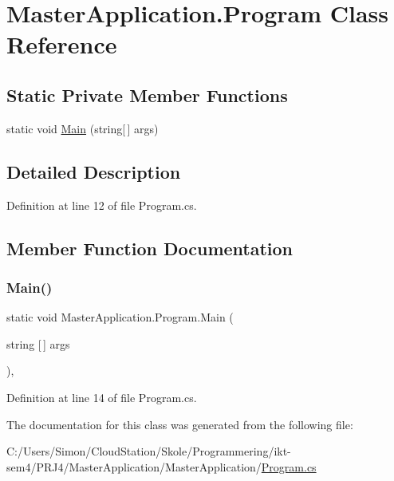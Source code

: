 \hypertarget{class_master_application_1_1_program}{}\section{Master\+Application.\+Program Class Reference}
\label{class_master_application_1_1_program}
\subsection*{Static Private Member Functions}
\begin{DoxyCompactItemize}
\item 
static void \mbox{\hyperlink{class_master_application_1_1_program_a4e4833be669000f1624832d6010d25e0}{Main}} (string\mbox{[}$\,$\mbox{]} args)
\end{DoxyCompactItemize}


\subsection{Detailed Description}


Definition at line 12 of file Program.\+cs.



\subsection{Member Function Documentation}
\mbox{\label{class_master_application_1_1_program_a4e4833be669000f1624832d6010d25e0}} 
\subsubsection{\texorpdfstring{Main()}{Main()}}
{\footnotesize\ttfamily static void Master\+Application.\+Program.\+Main (\begin{DoxyParamCaption}\item[{string \mbox{[}$\,$\mbox{]}}]{args }\end{DoxyParamCaption})\hspace{0.3cm}{\ttfamily [static]}, {\ttfamily [private]}}



Definition at line 14 of file Program.\+cs.



The documentation for this class was generated from the following file\+:\begin{DoxyCompactItemize}
\item 
C\+:/\+Users/\+Simon/\+Cloud\+Station/\+Skole/\+Programmering/ikt-\/sem4/\+P\+R\+J4/\+Master\+Application/\+Master\+Application/\mbox{\hyperlink{_master_application_2_master_application_2_program_8cs}{Program.\+cs}}\end{DoxyCompactItemize}

